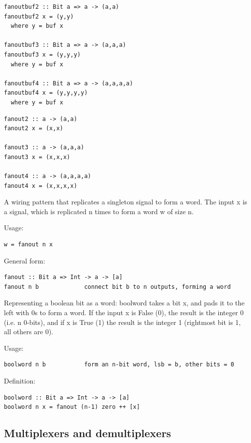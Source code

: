 \documentclass[]{svmono}
\begin{document}
\begin{verbatim}
fanoutbuf2 :: Bit a => a -> (a,a)
fanoutbuf2 x = (y,y)
  where y = buf x

fanoutbuf3 :: Bit a => a -> (a,a,a)
fanoutbuf3 x = (y,y,y)
  where y = buf x

fanoutbuf4 :: Bit a => a -> (a,a,a,a)
fanoutbuf4 x = (y,y,y,y)
  where y = buf x
\end{verbatim}



\begin{verbatim}
fanout2 :: a -> (a,a)
fanout2 x = (x,x)

fanout3 :: a -> (a,a,a)
fanout3 x = (x,x,x)

fanout4 :: a -> (a,a,a,a)
fanout4 x = (x,x,x,x)
\end{verbatim}


A wiring pattern that replicates a singleton signal to form a
word. The input x is a signal, which is replicated n times to form a
word w of size n.

Usage:
\begin{verbatim}
w = fanout n x
\end{verbatim}

General form:
\begin{verbatim}
fanout :: Bit a => Int -> a -> [a]
fanout n b             connect bit b to n outputs, forming a word
\end{verbatim}

Representing a boolean bit as a word: boolword takes a bit x, and
pads it to the left with 0s to form a word.  If the input x is
False (0), the result is the integer 0 (i.e. n 0-bits), and if x is
True (1) the result is the integer 1 (rightmost bit is 1, all
others are 0).

Usage:

\begin{verbatim}
boolword n b           form an n-bit word, lsb = b, other bits = 0
\end{verbatim}

Definition:

\begin{verbatim}
boolword :: Bit a => Int -> a -> [a]
boolword n x = fanout (n-1) zero ++ [x]
\end{verbatim}
\subsection*{Multiplexers and demultiplexers}
\label{sec:org7003628}
\end{document}
